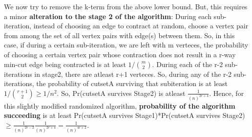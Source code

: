 \documentclass[10pt]{article}
\begin{document}
We now try to remove the k-term from the above lower bound. But, this requires a minor \textbf{alteration to the stage 2 of the algorithm}: During each sub-iteration, instead of choosing an edge to contract at random, choose a vertex pair from among the set of all vertex pairs with edge(s) between them. So, in this case, if during a certain sub-iteration, we are left with m verteces, the probability of choosing a certain vertex pair whose contraction does not result in a r-way min-cut edge being contracted is at least $1/\binom{m}{2}$. During each of the r-2 sub-iterations in stage2, there are atleast r+1 verteces. So, during any of the r-2 sub-iterations, the probability of cutsetA surviving that subiteration is at least $1/\binom{r+1}{2} \geq 1/n^{2}$. So, Pr(cutsetA survives Stage2) is atleast $\frac{1}{(n)^{2r+4}}$. Hence, for this slightly modified randomized algorithm, \textbf{probability of the algorithm succeeding} is at least Pr(cutsetA survives Stage1)*Pr(cutsetA survives Stage2) $\geq \frac{1}{(n)^{2r-2}}\frac{1}{(n)^{2r+4}} = \frac{1}{(n)^{4r+2}}$.



\end{document}

